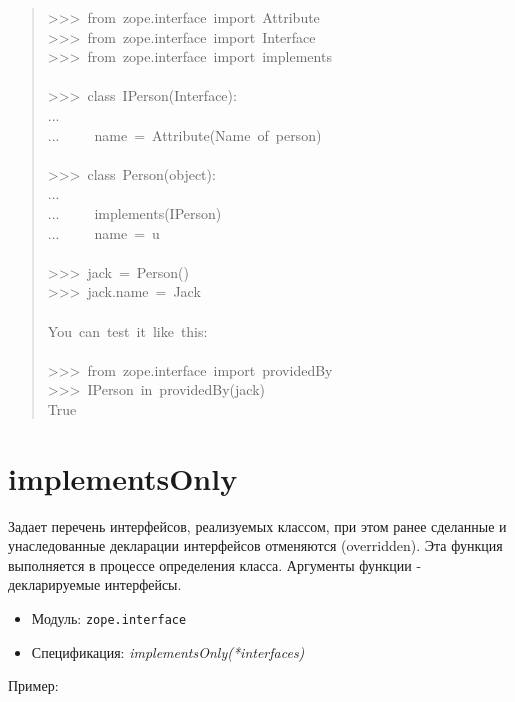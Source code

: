\documentclass[a4paper,openany,twoside,final]{book}
\providecommand*{\DUroletitlereference}[1]{\textsl{#1}}
\begin{document}
\begin{quote}{\ttfamily \raggedright \noindent
>{}>{}>~from~zope.interface~import~Attribute\\
>{}>{}>~from~zope.interface~import~Interface\\
>{}>{}>~from~zope.interface~import~implements\\
~\\
>{}>{}>~class~IPerson(Interface):\\
...\\
...~~~~~name~=~Attribute(\textquotedbl{}Name~of~person\textquotedbl{})\\
~\\
>{}>{}>~class~Person(object):\\
...\\
...~~~~~implements(IPerson)\\
...~~~~~name~=~u\textquotedbl{}\textquotedbl{}\\
~\\
>{}>{}>~jack~=~Person()\\
>{}>{}>~jack.name~=~\textquotedbl{}Jack\textquotedbl{}\\
~\\
You~can~test~it~like~this:\\
~\\
>{}>{}>~from~zope.interface~import~providedBy\\
>{}>{}>~IPerson~in~providedBy(jack)\\
True
}
\end{quote}


\section*{implementsOnly%
  \label{implementsonly}%
}

Задает перечень интерфейсов, реализуемых классом, при этом ранее
сделанные и унаследованные декларации интерфейсов отменяются
(overridden).  Эта функция выполняется в процессе определения класса.
Аргументы функции - декларируемые интерфейсы.

\begin{itemize}

\item Модуль: \texttt{zope.interface}

\item Спецификация: \DUroletitlereference{implementsOnly(*interfaces)}

\end{itemize}

Пример:
\end{document}
